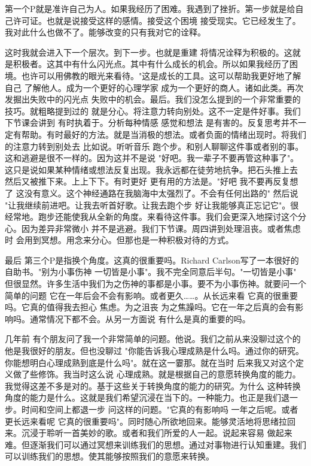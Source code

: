 第一个P就是准许自己为人。如果我经历了困难。我遇到了挫折。第一步就是给自己许可证。也就是说接受这样的感情。接受这个困境 接受现实。它已经发生了。我对此什么也做不了。能够改变的只有我对它的诠释。 

这时我就会进入下一个层次。到下一步。也就是重建 将情况诠释为积极的。这就是积极者。这其中有什么闪光点。其中有什么成长的机会。所以如果我经历了困境。也许可以用佛教的眼光来看待。"这是成长的工具。这可以帮助我更好地了解自己 了解他人。成为一个更好的心理学家 成为一个更好的商人。诸如此类。再次发掘出失败中的闪光点 失败中的机会。最后。我们没怎么提到的一个非常重要的技巧。就粗略提到过的 就是分心。将注意力转向别处。这不一定是件好事。我们下节课会讲到 有时执着于。分析每种情感 感觉和想法 是有害的。反复思考并不一定有帮助。有时最好的方法。就是当消极的想法。或者负面的情绪出现时。将我们的注意力转到别处去 比如说。听听音乐 跑个步。和别人聊聊这件事或者别的事。这和逃避是很不一样的。因为这并不是说 "好吧。我一辈子不要再管这种事了"。这只是说如果某种情绪或想法反复出现。我永远都在徒劳地抗争。把石头推上去 然后又被推下来。上上下下。有时更好 更有用的方法是。"好吧 我不要再反复想了 这没有意义。这个神经通路在我脑海中太强烈了。不会有任何出路的" 然后说 "让我继续前进吧。让我去听首好歌。让我去跑个步 好让我能够真正忘记它"。很经常地。跑步还能使我从全新的角度。来看待这件事。我们会更深入地探讨这个分心。因为差异非常微小 并不是逃避。我们下节课。周四讲到处理沮丧。或者焦虑时 会用到冥想。用念来分心。但那也是一种积极对待的方式。 

最后 第三个P是指换个角度。这真的很重要吗。Richard Carlson写了一本很好的自助书。"别为小事伤神 一切皆是小事"。我不完全同意后半句。"一切皆是小事" 但很显然。许多生活中我们为之伤神的事都是小事。要不为小事伤神。就要问一个简单的问题 它在一年后会不会有影响。或者更久……。从长远来看 它真的很重要吗。它真的值得我去担心 焦虑。为之沮丧 为之焦躁吗。它在一年之后真的会有影响吗。通常情况下都不会。从另一方面说 有什么是真的重要的吗。 

几年前 有个朋友问了我一个非常简单的问题。他说。我们之前从来没聊过这个的 他是我很好的朋友。但也没聊过 "你能告诉我心理成熟是什么吗。通过你的研究。你能想明白心理成熟到底是什么吗"。就在这一霎那。就在当时 后来我又对这个定义做了些修饰。我当时这么说 心理成熟。就是根据自己的意愿转换角度的能力。我觉得这差不多是对的。基于这些关于转换角度的能力的研究。为什么 这种转换角度的能力是什么。这就是我们希望沉浸在当下的。一种能力。也正是我们退一步。时间和空间上都退一步 问这样的问题。"它真的有影响吗 一年之后呢。或者更长远来看呢 它真的很重要吗"。同时随心所欲地回来。能够灵活地将思绪拉回来。沉浸于聆听一首美妙的歌。或者和我们所爱的人一起。说起来容易 做起来难。但逐渐我们可以通过冥想来训练我们的思想。通过对事物进行认知重建。我们可以训练我们的思想。使其能够按照我们的意愿来转换。 

